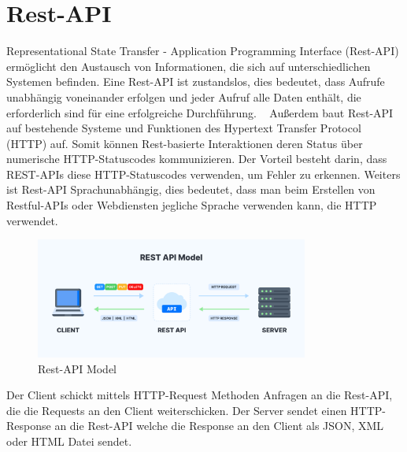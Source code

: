 \section{Rest-API}
Representational State Transfer - Application Programming Interface (Rest-API) ermöglicht den Austausch von
Informationen, die sich auf unterschiedlichen Systemen befinden. Eine Rest-API ist zustandslos, dies bedeutet,
dass Aufrufe unabhängig voneinander erfolgen und jeder Aufruf alle Daten enthält, 
die erforderlich sind für eine erfolgreiche Durchführung.
~\cite{rest_api_ryte}
\newline
\newline
Außerdem baut Rest-API auf bestehende Systeme und Funktionen des Hypertext Transfer Protocol (HTTP) auf. 
Somit können Rest-basierte Interaktionen deren Status über numerische HTTP-Statuscodes kommunizieren. 
Der Vorteil besteht darin, dass REST-APIs diese HTTP-Statuscodes verwenden, um Fehler zu erkennen.
\newline
\newline
Weiters ist Rest-API Sprachunabhängig, dies bedeutet, dass man beim Erstellen von Restful-APIs oder 
Webdiensten jegliche Sprache verwenden kann, die HTTP verwendet. 
~\cite{rest_api_tech_target}
\newline
\newline
\begin{figure}[!htb]
  \includegraphics[width=0.8\textwidth]{pics/api-rest-model.png}
  \centering
  \caption{Rest-API Model ~\cite{rest_api_model}}
\end{figure}
\newline
Der Client schickt mittels HTTP-Request Methoden Anfragen an die Rest-API, die die Requests an den Client
weiterschicken.
\newline
Der Server sendet einen HTTP-Response an die Rest-API welche die Response an den Client als JSON,
XML oder HTML Datei sendet.

